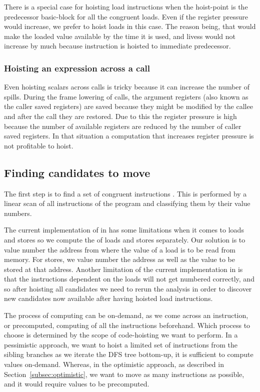 \documentclass[sigplan,10pt,review,anonymous]{acmart}\settopmatter{printfolios=true,printccs=false,printacmref=false}
\begin{document}
There is a special case for hoisting load instructions when the hoist-point is
the predecessor basic-block for all the congruent loads. Even if the register
pressure would increase, we prefer to hoist loads in this case. The reason
being, that would make the loaded value available by the time it is used, and
livess would not increase by much because instruction is hoisted to immediate
predecessor.


\subsubsection{Hoisting an expression across a call}
\label{cost:across-calls}
Even hoisting scalars across calls is tricky because it can increase the number
of spills. During the frame lowering of calls, the argument registers (also
known as the caller saved registers) are saved because they might be modified by
the callee and after the call they are restored. Due to this the register
pressure is high because the number of available registers are reduced by the
number of caller saved registers. In that situation a computation that increases
register pressure is not profitable to hoist.


\subsection{Finding candidates to move}
\label{subsec:finding-candidates}
The first step is to find a set of congruent instructions
\cite{briggs1997}. This is performed by a linear scan of all instructions of the
program and classifying them by their value numbers.

The current implementation of \GVN{} in \LLVM{} has some limitations when it
comes to loads and stores so we compute the \GVN{} of loads and stores
separately.  Our solution is to value number the address from where the value of
a load is to be read from memory. For stores, we value number the address as
well as the value to be stored at that address. Another limitation of the
current \GVN{} implementation in \LLVM{} is that the instructions dependent on
the loads will not get numbered correctly, and so after hoisting all candidates
we need to rerun the \GVN{} analysis in order to discover new candidates now
available after having hoisted load instructions.

The process of computing \GVN{} can be on-demand, as we come across an
instruction, or precomputed, computing \GVN{} of all the instructions
beforehand. Which process to choose is determined by the scope of code-hoisting
we want to perform. In a pessimistic approach, we want to hoist a limited set of
instructions from the sibling branches as we iterate the DFS tree bottom-up, it
is sufficient to compute \GVN{} values on-demand. Whereas, in the optimistic
approach, as described in Section~\ref{subsec:optimistic}, we want to move as
many instructions as possible, and it would require \GVN{} values to be
precomputed.
\end{document}

